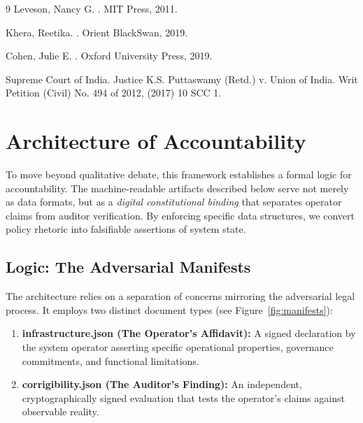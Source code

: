 \documentclass{article}
\begin{document}
\begin{thebibliography}{9}
Leveson, Nancy G.
.
\newblock MIT Press, 2011.

Khera, Reetika.
.
\newblock Orient BlackSwan, 2019.

Cohen, Julie E.
.
\newblock Oxford University Press, 2019.

Supreme Court of India.
\newblock Justice K.S. Puttaswamy (Retd.) v. Union of India.
\newblock Writ Petition (Civil) No. 494 of 2012, (2017) 10 SCC 1.

\end{thebibliography}

\appendix

\section{Architecture of Accountability}
\label{appendix:architecture}

To move beyond qualitative debate, this framework establishes a formal logic for accountability. The machine-readable artifacts described below serve not merely as data formats, but as a \textit{digital constitutional binding} that separates operator claims from auditor verification. By enforcing specific data structures, we convert policy rhetoric into falsifiable assertions of system state.

\subsection{Logic: The Adversarial Manifests}

The architecture relies on a separation of concerns mirroring the adversarial legal process. It employs two distinct document types (see Figure~\ref{fig:manifests}):

\begin{enumerate}
    \item \textbf{infrastructure.json (The Operator's Affidavit):} A signed declaration by the system operator asserting specific operational properties, governance commitments, and functional limitations.
    \item \textbf{corrigibility.json (The Auditor's Finding):} An independent, cryptographically signed evaluation that tests the operator's claims against observable reality.
\end{enumerate}
\end{document}
